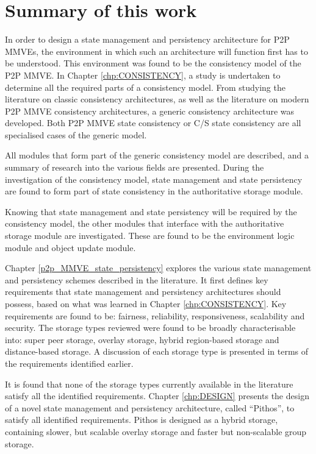 \section{Summary of this work}

In order to design a state management and persistency architecture for P2P MMVEs, the environment in which such an architecture will function first has to be understood. This environment was found to be the consistency model of the P2P MMVE. In Chapter \ref{chp:CONSISTENCY}, a study is undertaken to determine all the required parts of a consistency model. From studying the literature on classic consistency architectures, as well as the literature on modern P2P MMVE consistency architectures, a generic consistency architecture was developed. Both P2P MMVE state consistency or C/S state consistency are all specialised cases of the generic model.

All modules that form part of the generic consistency model are described, and a summary of research into the various fields are presented. During the investigation of the consistency model, state management and state persistency are found to form part of state consistency in the authoritative storage module.

Knowing that state management and state persistency will be required by the consistency model, the other modules that interface with the authoritative storage module are investigated. These are found to be the environment logic module and object update module.

Chapter \ref{p2p_MMVE_state_persistency} explores the various state management and persistency schemes described in the literature. It first defines key requirements that state management and persistency architectures should possess, based on what was learned in Chapter \ref{chp:CONSISTENCY}. Key requirements are found to be: fairness, reliability, responsiveness, scalability and security. The storage types reviewed were found to be broadly characterisable into: super peer storage, overlay storage, hybrid region-based storage and distance-based storage. A discussion of each storage type is presented in terms of the requirements identified earlier.

It is found that none of the storage types currently available in the literature satisfy all the identified requirements. Chapter \ref{chp:DESIGN} presents the design of a novel state management and persistency architecture, called ``Pithos'', to satisfy all identified requirements. Pithos is designed as a hybrid storage, containing slower, but scalable overlay storage and faster but non-scalable group storage.

